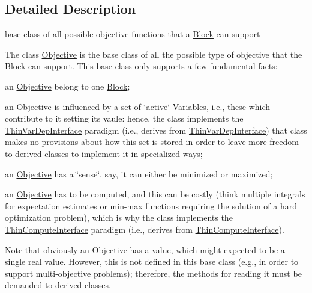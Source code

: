 \subsection{Detailed Description}
base class of all possible objective functions that a \mbox{\hyperlink{class_s_m_spp__di__unipi__it_1_1_block}{Block}} can support 

The class \mbox{\hyperlink{class_s_m_spp__di__unipi__it_1_1_objective}{Objective}} is the base class of all the possible type of objective that the \mbox{\hyperlink{class_s_m_spp__di__unipi__it_1_1_block}{Block}} can support. This base class only supports a few fundamental facts\+:


\begin{DoxyItemize}
\item an \mbox{\hyperlink{class_s_m_spp__di__unipi__it_1_1_objective}{Objective}} belong to one \mbox{\hyperlink{class_s_m_spp__di__unipi__it_1_1_block}{Block}};
\item an \mbox{\hyperlink{class_s_m_spp__di__unipi__it_1_1_objective}{Objective}} is influenced by a set of \char`\"{}active\char`\"{} Variables, i.\+e., these which contribute to it setting its vaule\+: hence, the class implements the \mbox{\hyperlink{class_s_m_spp__di__unipi__it_1_1_thin_var_dep_interface}{Thin\+Var\+Dep\+Interface}} paradigm (i.\+e., derives from \mbox{\hyperlink{class_s_m_spp__di__unipi__it_1_1_thin_var_dep_interface}{Thin\+Var\+Dep\+Interface}}) that class makes no provisions about how this set is stored in order to leave more freedom to derived classes to implement it in specialized ways;
\item an \mbox{\hyperlink{class_s_m_spp__di__unipi__it_1_1_objective}{Objective}} has a \char`\"{}sense\char`\"{}, say, it can either be minimized or maximized;
\item an \mbox{\hyperlink{class_s_m_spp__di__unipi__it_1_1_objective}{Objective}} has to be computed, and this can be costly (think multiple integrals for expectation estimates or min-\/max functions requiring the solution of a hard optimization problem), which is why the class implements the \mbox{\hyperlink{class_s_m_spp__di__unipi__it_1_1_thin_compute_interface}{Thin\+Compute\+Interface}} paradigm (i.\+e., derives from \mbox{\hyperlink{class_s_m_spp__di__unipi__it_1_1_thin_compute_interface}{Thin\+Compute\+Interface}}).
\end{DoxyItemize}

Note that obviously an \mbox{\hyperlink{class_s_m_spp__di__unipi__it_1_1_objective}{Objective}} has a value, which might expected to be a single real value. However, this is not defined in this base class (e.\+g., in order to support multi-\/objective problems); therefore, the methods for reading it must be demanded to derived classes.

